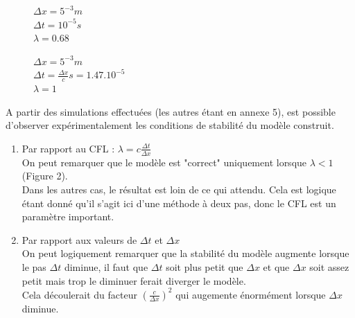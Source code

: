     
\begin{figure}[H]
\begin{minipage}[b]{.46\linewidth}
\centering{}
\caption{
        $\Delta x= 5^{-3}m $\\
        $\Delta t= 10^{-4}s$\\
        $\lambda = 6.8$
    \label{fig1}
    }
\end{minipage} \hfill
\begin{minipage}[b]{.46\linewidth}
\centering{}
\caption{$\Delta x= 5^{-3}m $\\ 
        $\Delta t= 10^{-5}s$\\
        $\lambda = 0.68$
        \label{fig2}}
\end{minipage}
\end{figure}

\begin{figure}[H]
\begin{minipage}[b]{.46\linewidth}
\centering{}
\caption{$\Delta x= 5^{-2}m $\\ 
        $\Delta t= 10^{-6}s$\\
        $\lambda = 0.0068$
        \label{fig1}}
\end{minipage} \hfill
\begin{minipage}[b]{.46\linewidth}
\centering{}
\caption{$\Delta x= 5^{-3} m $\\ 
        $\Delta t= \frac{\Delta x}{c}s= 1.47.10^{-5} $\\
        $\lambda = 1$
        \label{fig2}}
\end{minipage}
\end{figure}


A partir des simulations effectuées (les autres étant en annexe 5), est possible d'observer expérimentalement les conditions de stabilité du modèle construit.
\begin{enumerate}
    \item Par rapport au CFL : $\lambda = c\frac{\Delta t}{\Delta x}$\\
    On peut remarquer que le modèle est "correct" uniquement lorsque $\lambda < 1 $  (Figure 2).\\
    Dans les autres cas, le résultat est loin de ce qui attendu. Cela est logique étant donné qu'il s'agit ici d'une méthode à deux pas, donc le CFL est un paramètre important.
    \item Par rapport aux valeurs  de $\Delta t$ et $\Delta x$ \\
    On peut logiquement remarquer que la stabilité du modèle augmente lorsque le pas $\Delta t$ diminue, il faut que $\Delta t$ soit plus petit que $\Delta x$ et que $\Delta x$ soit assez petit mais trop le diminuer ferait diverger le modèle.\\
    Cela découlerait du facteur $(\frac{c}{\Delta x})^2$ qui augemente énormément lorsque $\Delta x$ diminue.
    
\end{enumerate}


